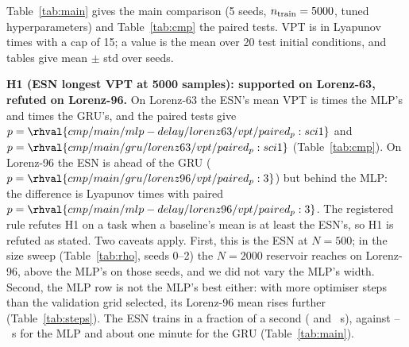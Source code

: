 Table~\ref{tab:main} gives the main comparison (5 seeds, $n_{\rm train}=5000$, tuned hyperparameters) and Table~\ref{tab:cmp} the paired tests. VPT is in Lyapunov times with a cap of 15; a value is the mean over 20 test initial conditions, and tables give mean $\pm$ std over seeds.

\begin{table}[t]\centering\caption{Main results, $n_{\rm train}=5000$, 5 seeds (mean $\pm$ std over seeds). \texttt{vpt\_min}: shortest VPT over the 20 initial conditions. ``True system'': the ODE integrated from the same warm-ups (sampling floor of the climate metrics; its VPT is the cap). No best/second marks are printed because several columns are tied.}\label{tab:main}
\small\end{table}

\begin{table}[t]\centering\caption{Paired comparisons over the 5 seeds of Table~\ref{tab:main} (\texttt{rh compare}). Differences are A $-$ B (positive: A is higher); $p$ is the paired $t$-test, n/a where the per-seed differences have zero variance.}\label{tab:cmp}
\small\setlength{\tabcolsep}{3pt}\resizebox{\columnwidth}{!}{}\end{table}

\textbf{H1 (ESN longest VPT at 5000 samples): supported on Lorenz-63, refuted on Lorenz-96.} On Lorenz-63 the ESN's mean VPT is  times the MLP's and  times the GRU's, and the paired tests give $p=\rhval{cmp/main/mlp-delay/lorenz63/vpt/paired_p:sci1}$ and $p=\rhval{cmp/main/gru/lorenz63/vpt/paired_p:sci1}$ (Table~\ref{tab:cmp}). On Lorenz-96 the ESN is ahead of the GRU ($p=\rhval{cmp/main/gru/lorenz96/vpt/paired_p:3}$) but behind the MLP: the difference is  Lyapunov times with paired $p=\rhval{cmp/main/mlp-delay/lorenz96/vpt/paired_p:3}$. The registered rule refutes H1 on a task when a baseline's mean is at least the ESN's, so H1 is refuted as stated. Two caveats apply. First, this is the ESN at $N=500$; in the size sweep (Table~\ref{tab:rho}, seeds 0--2) the $N=2000$ reservoir reaches  on Lorenz-96, above the MLP's  on those seeds, and we did not vary the MLP's width. Second, the MLP row is not the MLP's best either: with more optimiser steps than the validation grid selected, its Lorenz-96 mean rises further (Table~\ref{tab:steps}). The ESN trains in a fraction of a second ( and ~s), against --~s for the MLP and about one minute for the GRU (Table~\ref{tab:main}).

